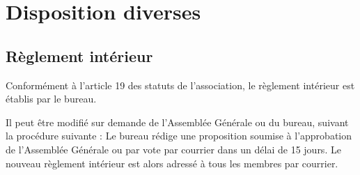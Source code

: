 \documentclass[a4paper,french,10pt]{article}
\begin{document}
\section{Disposition diverses}
\subsection{Règlement intérieur}
Conformément à l'article 19 des statuts de l'association, le règlement intérieur est établis par le bureau.

Il peut être modifié sur demande de l'Assemblée Générale ou du bureau, suivant la procédure suivante :
Le bureau rédige une proposition soumise à l'approbation de l'Assemblée Générale ou par vote par courrier dans un délai de 15 jours.
Le nouveau règlement intérieur est alors adressé à tous les membres par courrier.
\end{document}
